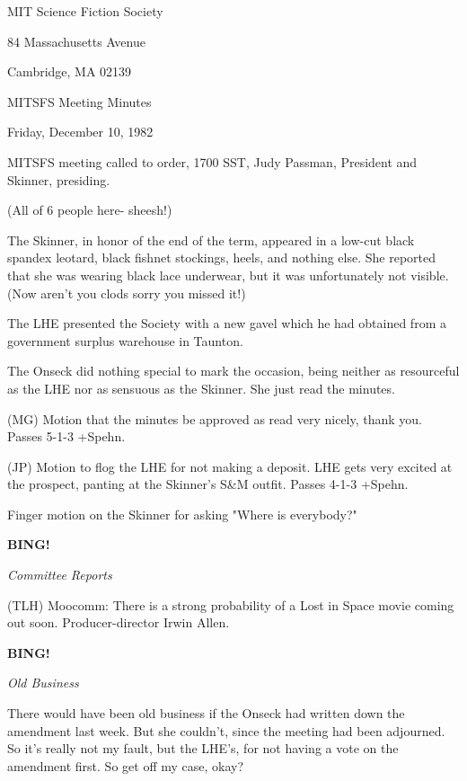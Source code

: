 \documentclass[12pt]{article}
\newcommand{\bing}{{\bf BING!} }
\newcommand{\goto}[1]{\bing \vskip 12pt \centerline{{\em{#1}}}}
\begin{document}
\begin{center}

MIT Science Fiction Society 

84 Massachusetts Avenue

Cambridge, MA 02139

\vspace{12pt}

MITSFS Meeting Minutes 

Friday, December 10, 1982

\end{center}
 
\vspace{18pt}

\setlength{\parskip}{6pt}

\noindent
MITSFS meeting called to order, 1700 SST,
Judy Passman, President and Skinner, presiding.

(All of 6 people here- sheesh!)

The Skinner, in honor of the end of the term, appeared in a low-cut black spandex leotard, black fishnet stockings, heels, and nothing else. She reported that she was wearing black lace underwear, but it was unfortunately not visible. (Now aren't you clods sorry you missed it!)

The LHE presented the Society with a new gavel which he had obtained from a government surplus warehouse in Taunton.

The Onseck did nothing special to mark the occasion, being neither as resourceful as the LHE nor as sensuous as the Skinner. She just read the minutes.

(MG) Motion that the minutes be approved as read very nicely, thank you. Passes 5-1-3 +Spehn.

(JP) Motion to flog the LHE for not making a deposit. LHE gets very excited at the prospect, panting at the Skinner's S&M outfit. Passes 4-1-3 +Spehn.

Finger motion on the Skinner for asking "Where is everybody?"

\goto{Committee Reports}

(TLH) Moocomm: There is a strong probability of a Lost in Space movie coming out soon. Producer-director Irwin Allen.

\goto{Old Business}

There would have been old business if the Onseck had written down the amendment last week. But she couldn't, since the meeting had been adjourned. So it's really not my fault, but the LHE's, for not having a vote on the amendment first. So get off my case, okay?
\end{document}
